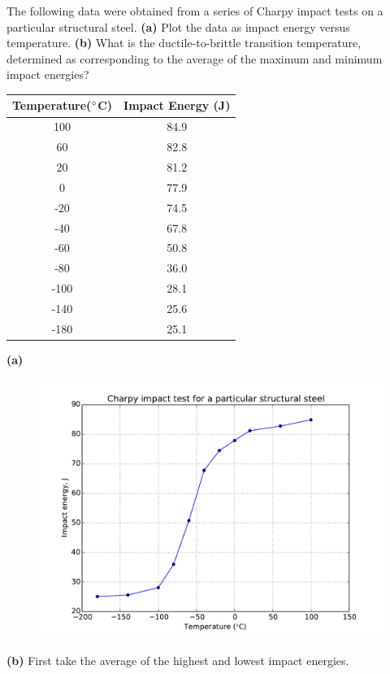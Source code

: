 \documentclass[12pt]{article}
\newenvironment{problem}[2][Problem]{\begin{trivlist}
\item[\hskip \labelsep {\bfseries #1}\hskip \labelsep {\bfseries #2.}]}{\end{trivlist}}
\begin{document}
\begin{problem}{8.4}
 The following data were obtained from a series of Charpy impact tests on a particular structural steel. \textbf{(a)} Plot the data as impact energy versus temperature. \textbf{(b)}  What is the ductile-to-brittle transition temperature, determined as corresponding to the average of the maximum and minimum impact energies? 
 \begin{center}
 \begin{tabular}{c | c}
 Temperature($\degree$C) & Impact Energy (J) \\ \hline
100 & 84.9 \\ \hline
60 & 82.8 \\ \hline
20 & 81.2 \\ \hline
0 & 77.9 \\ \hline
-20 & 74.5 \\ \hline
-40 & 67.8 \\ \hline
-60 & 50.8 \\ \hline
-80 & 36.0 \\ \hline
-100 & 28.1 \\ \hline
-140 & 25.6 \\ \hline
-180 & 25.1 \\ \hline
 \end{tabular}
 \end{center}
 \end{problem}

\textbf{(a)}
\begin{figure}[H]
\centering
\includegraphics[width=350pt]{p2.pdf}
\caption{}
\end{figure}

\textbf{(b)} First take the average of the highest and lowest impact energies.
\end{document}
